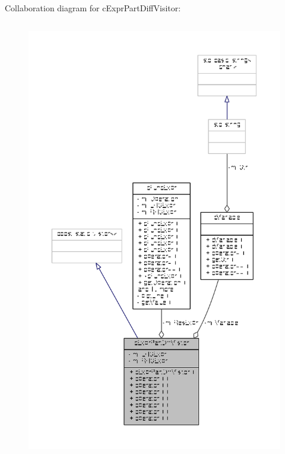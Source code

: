 Collaboration diagram for c\-Expr\-Part\-Diff\-Visitor\-:
\nopagebreak
\begin{figure}[H]
\begin{center}
\leavevmode
\includegraphics[height=550pt]{classcExprPartDiffVisitor__coll__graph}
\end{center}
\end{figure}
